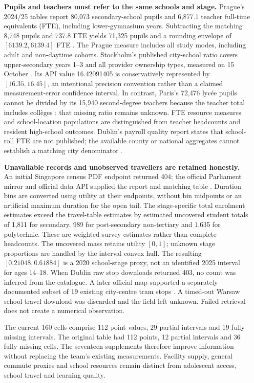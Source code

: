 \textbf{Pupils and teachers must refer to the same schools and stage.}
Prague's 2024/25 tables report 80,073 secondary-school pupils and 6,877.1
teacher full-time equivalents (FTE), including lower-gymnasium years.
Subtracting the matching 8,748 pupils and 737.8 FTE yields 71,325 pupils and
a rounding envelope of $[6139.2,6139.4]$ FTE \cite{prague}. The Prague
measure includes all study modes, including adult and non-daytime cohorts.
Stockholm's
published city-school ratio covers upper-secondary years 1--3 and all provider
ownership types, measured on 15 October \cite{kolada}. Its API value
16.42091405 is conservatively represented by $[16.35,16.45]$, an intentional
precision convention rather than a claimed measurement-error confidence interval.
In contrast, Paris's 72,476 lyc\'ee pupils cannot be divided by its 15,940
second-degree teachers because the teacher total includes coll\`eges
\cite{parisedu}; that missing ratio remains unknown. FTE resource measures
and school-location populations are distinguished from teacher headcounts and
resident high-school outcomes. Dublin's payroll quality report states that school-roll FTE are not published; the available county or national aggregates cannot establish a matching city denominator \cite{irelandfte}.

\textbf{Unavailable records and unobserved travellers are retained honestly.}
An initial Singapore census PDF endpoint returned 404; the official Parliament
mirror and official data API supplied the report and matching table
\cite{singapore}. Duration bins are converted using utility at their endpoints,
without bin midpoints or an artificial maximum duration for the open tail.
The stage-specific total enrolment estimates exceed the travel-table estimates
by estimated uncovered student totals of 1,811 for secondary, 989 for
post-secondary non-tertiary and 1,635 for polytechnic. These are weighted
survey estimates rather than complete headcounts. The uncovered mass retains
utility $[0,1]$; unknown stage proportions are
handled by the interval convex hull. The resulting $[0.21048,0.61884]$ is a
2020 school-stage proxy, not an identified 2025 interval for ages 14--18.
When Dublin raw stop downloads returned 403, no count was inferred from the
catalogue. A later official map supported a separately documented subset of
19 existing city-centre tram stops \cite{dublin}. A timed-out Warsaw school-travel download
was discarded and the field left unknown. Failed retrieval does not create a
numerical observation.

The current 160 cells comprise 112 point values, 29 partial intervals and
19 fully missing intervals. The original table had 112 points, 12 partial
intervals and 36 fully missing cells. The seventeen supplements therefore improve
information without replacing the team's existing measurements. Facility supply,
general commute proxies and school resources remain distinct from adolescent
access, school travel and learning quality.

